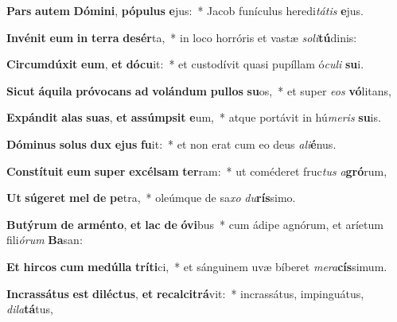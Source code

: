 \item \textbf{Pars} \textbf{au}\textbf{tem} \textbf{Dó}\textbf{mi}\textbf{ni}, \textbf{pó}\textbf{pu}\textbf{lus} \textbf{e}jus:~* Jacob funículus heredi\textit{tá}\textit{tis} \textbf{e}jus.
\item \textbf{In}\textbf{vé}\textbf{nit} \textbf{e}\textbf{um} \textbf{in} \textbf{ter}\textbf{ra} \textbf{de}\textbf{sér}ta,~* in loco horróris et vastæ \textit{so}\textit{li}\textbf{tú}dinis:
\item \textbf{Cir}\textbf{cum}\textbf{dú}\textbf{xit} \textbf{e}\textbf{um}, \textbf{et} \textbf{dó}\textbf{cu}it:~* et custodívit quasi pupíllam ó\textit{cu}\textit{li} \textbf{su}i.
\item \textbf{Sic}\textbf{ut} \textbf{á}\textbf{qui}\textbf{la} \textbf{pró}\textbf{vo}\textbf{cans} \textbf{ad} \textbf{vo}\textbf{lán}\textbf{dum} \textbf{pul}\textbf{los} \textbf{su}os,~* et super \textit{e}\textit{os} \textbf{vó}litans,
\item \textbf{Ex}\textbf{pán}\textbf{dit} \textbf{a}\textbf{las} \textbf{su}\textbf{as}, \textbf{et} \textbf{as}\textbf{súmp}\textbf{sit} \textbf{e}um,~* atque portávit in hú\textit{me}\textit{ris} \textbf{su}is.
\item \textbf{Dó}\textbf{mi}\textbf{nus} \textbf{so}\textbf{lus} \textbf{dux} \textbf{e}\textbf{jus} \textbf{fu}it:~* et non erat cum eo deus \textit{a}\textit{li}\textbf{é}nus.
\item \textbf{Con}\textbf{stí}\textbf{tu}\textbf{it} \textbf{e}\textbf{um} \textbf{su}\textbf{per} \textbf{ex}\textbf{cél}\textbf{sam} \textbf{ter}ram:~* ut coméderet fruc\textit{tus} \textit{a}\textbf{gró}rum,
\item \textbf{Ut} \textbf{sú}\textbf{ge}\textbf{ret} \textbf{mel} \textbf{de} \textbf{pe}tra,~* oleúmque de sa\textit{xo} \textit{du}\textbf{rís}simo.
\item \textbf{Bu}\textbf{tý}\textbf{rum} \textbf{de} \textbf{ar}\textbf{mén}\textbf{to}, \textbf{et} \textbf{lac} \textbf{de} \textbf{ó}\textbf{vi}bus~* cum ádipe agnórum, et aríetum fili\textit{ó}\textit{rum} \textbf{Ba}san:
\item \textbf{Et} \textbf{hir}\textbf{cos} \textbf{cum} \textbf{me}\textbf{dúl}\textbf{la} \textbf{trí}\textbf{ti}ci,~* et sánguinem uvæ bíberet \textit{me}\textit{ra}\textbf{cís}simum.
\item \textbf{In}\textbf{cras}\textbf{sá}\textbf{tus} \textbf{est} \textbf{di}\textbf{léc}\textbf{tus}, \textbf{et} \textbf{re}\textbf{cal}\textbf{ci}\textbf{trá}vit:~* incrassátus, impinguátus, \textit{di}\textit{la}\textbf{tá}tus,
